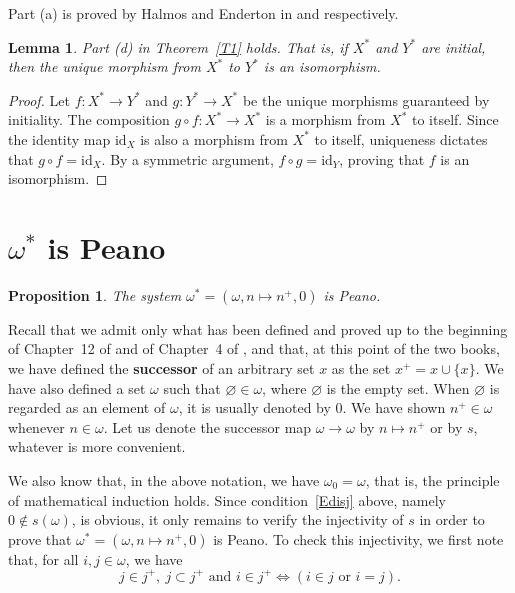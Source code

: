 \documentclass[12pt,letterpaper]{article}
\newtheorem{lem}[thm]{Lemma} %
\newtheorem{prop}[thm]{Proposition}
\begin{document}
Part (a) is proved by Halmos and Enderton in \cite{halmos_naive_1974} and \cite{Enderton1977} respectively. 

\begin{lem}\label{Ld} 
Part \emph{(d)} in Theorem~\ref{T1} holds. That is, if \(X^*\) and \(Y^*\) are initial, then the unique morphism from \(X^*\) to \(Y^*\) is an isomorphism. 
\end{lem} 
\begin{proof}  
Let \(f: X^* \to Y^*\) and \(g: Y^* \to X^*\) be the unique morphisms guaranteed by initiality. The composition \(g \circ f: X^* \to X^*\) is a morphism from \(X^*\) to itself. Since the identity map \(\text{id}_X\) is also a morphism from \(X^*\) to itself, uniqueness dictates that \(g \circ f = \text{id}_X\). By a symmetric argument, \(f \circ g = \text{id}_Y\), proving that \(f\) is an isomorphism.
\end{proof} 

\section{\texorpdfstring{\(\omega^*\)}{ω*} is Peano} %

\begin{prop}\label{Pp} 
The system \(\omega^*=(\omega,n\mapsto n^+,0)\) is Peano. 
\end{prop} 

Recall that we admit only what has been defined and proved up to the beginning of Chapter~12 of \cite{halmos_naive_1974} and of Chapter~4 of \cite{Enderton1977}, and that, at this point of the two books, we have defined the \textbf{successor} of an arbitrary set \(x\) as the set \(x^+=x\cup\{x\}\). We have also defined a set \(\omega\) such that \(\varnothing\in\omega\), where \(\varnothing\) is the empty set. When \(\varnothing\) is regarded as an element of \(\omega\), it is usually denoted by 0. We have shown \(n^+\in\omega\) whenever \(n\in\omega\). Let us denote the successor map \(\omega\to\omega\) by \(n\mapsto n^+\) or by \(s\), whatever is more convenient. 

We also know that, in the above notation, we have \(\omega_0=\omega\), that is, the principle of mathematical induction holds. Since condition~\eqref{Edisj} above, namely \(0\notin s(\omega)\), is obvious, it only remains to verify the injectivity of \(s\) in order to prove that \(\omega^*=(\omega,n\mapsto n^+,0)\) is Peano. To check this injectivity, we first note that, for all \(i,j\in\omega\), we have 
\begin{equation}\label{Emain}
j\in j^+,\ j\subset j^+\text{ and }i\in j^+\Leftrightarrow (i\in j\text{ or }i=j). 
\end{equation} 
\end{document}
